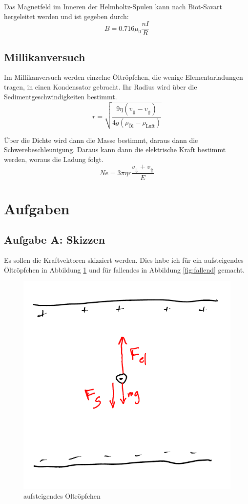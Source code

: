 \documentclass[11pt]{article}
\begin{document}
Das Magnetfeld im Inneren der Helmholtz-Spulen kann nach Biot-Savart
hergeleitet werden und ist gegeben durch:
\begin{equation}
	\label{eq:Helmholtz}
	B = 0.716 \mu_0 \frac{nI}R
\end{equation}

\subsection{Millikanversuch}

Im Millikanversuch werden einzelne Öltröpfchen, die wenige Elementarladungen
tragen, in einen Kondensator gebracht. Ihr Radius wird über die
Sedimentgeschwindigkeiten bestimmt.
%
\begin{equation}
	\label{eq:249.8}
	r = \sqrt{\frac{9 \eta \left( v_\Downarrow - v_\Uparrow \right)}{4 g (\rho_\text{Öl} - \rho_\text{Luft})}}
\end{equation}

Über die Dichte wird dann die Masse bestimmt, daraus dann die
Schwerebeschleunigung. Daraus kann dann die elektrische Kraft bestimmt werden,
woraus die Ladung folgt.
%
\begin{equation}
	\label{eq:249.9}
	N e = 3 \pi \eta r \frac{v_\Downarrow + v_\Uparrow }E
\end{equation}


\section{Aufgaben}

\subsection{Aufgabe A: Skizzen}

Es sollen die Kraftvektoren skizziert werden. Dies habe ich für ein
aufsteigendes Öltröpfchen in Abbildung \ref{fig:aufsteigend} und für fallendes
in Abbildung \ref{fig:fallend} gemacht.

\begin{figure}[h!]
	\centering
	\includegraphics[width=.5\textwidth]{aufsteigend.pdf}
	\caption{aufsteigendes Öltröpfchen}
	\label{fig:aufsteigend}
\end{figure}
\end{document}
